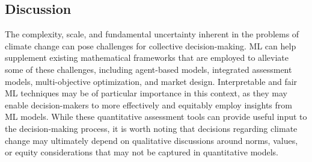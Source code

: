 \documentclass[11pt]{report}
\begin{document}
\subsection{Discussion}
The complexity, scale, and fundamental uncertainty inherent in the problems of climate change can pose challenges for collective decision-making.
ML can help supplement existing mathematical frameworks that are employed to alleviate some of these challenges, including agent-based models, integrated assessment models, multi-objective optimization, and market design. 
Interpretable and fair ML techniques may be of particular importance in this context, as they may enable decision-makers to more effectively and equitably employ insights from ML models.
While these quantitative assessment tools can provide useful input to the decision-making process, it is worth noting that decisions regarding climate change may ultimately depend on qualitative discussions around norms, values, or equity considerations that may not be captured in quantitative models.
\end{document}
